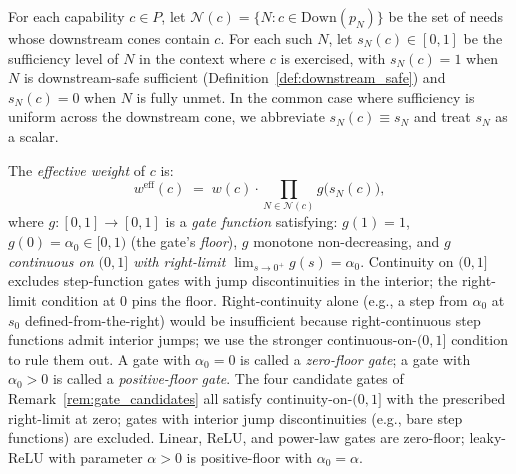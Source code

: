 \begin{definition}
\label{def:downstream_gate}
For each capability $c \in P$, let $\mathcal{N}(c) = \{N : c \in
\mathrm{Down}(p_N)\}$ be the set of needs whose downstream cones
contain $c$.  For each such $N$, let $s_N(c) \in [0, 1]$ be the
sufficiency level of $N$ in the context where $c$ is exercised,
with $s_N(c) = 1$ when $N$ is downstream-safe sufficient
(Definition~\ref{def:downstream_safe}) and $s_N(c) = 0$ when $N$
is fully unmet.  In the common case where sufficiency is uniform
across the downstream cone, we abbreviate $s_N(c) \equiv s_N$ and
treat $s_N$ as a scalar.

The \emph{effective weight} of $c$ is:
\[
  w^{\mathrm{eff}}(c) \;=\; w(c) \cdot
  \prod_{N \in \mathcal{N}(c)} g\bigl(s_N(c)\bigr),
\]
where $g : [0, 1] \to [0, 1]$ is a \emph{gate function} satisfying:
$g(1) = 1$, $g(0) = \alpha_0 \in [0, 1)$ (the gate's
\emph{floor}), $g$ monotone non-decreasing, and $g$
\emph{continuous on $(0, 1]$ with right-limit
$\lim_{s \to 0^+} g(s) = \alpha_0$}.  Continuity on $(0, 1]$
excludes step-function gates with jump discontinuities in the
interior; the right-limit condition at $0$ pins the floor.
Right-continuity alone (e.g., a step from $\alpha_0$ at $s_0$
defined-from-the-right) would be insufficient because
right-continuous step functions admit interior jumps; we use
the stronger continuous-on-$(0,1]$ condition to rule them out.
A gate with $\alpha_0 = 0$ is called a
\emph{zero-floor gate}; a gate with $\alpha_0 > 0$ is called a
\emph{positive-floor gate}.  The four candidate gates of
Remark~\ref{rem:gate_candidates} all satisfy
continuity-on-$(0,1]$ with the prescribed right-limit at zero;
gates with interior jump discontinuities (e.g., bare step
functions) are excluded.  Linear, ReLU, and power-law
gates are zero-floor; leaky-ReLU with parameter $\alpha > 0$ is
positive-floor with $\alpha_0 = \alpha$.


\end{definition}

